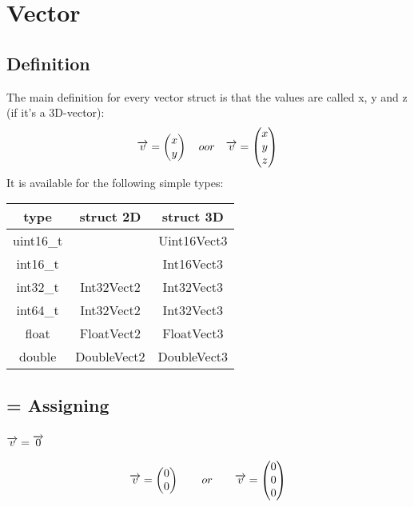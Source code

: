 \section{Vector}
\subsection{Definition}
The main definition for every vector struct is that the values are called x, y and z (if it's a 3D-vector):
\begin{equation}
\overrightarrow{v} = \begin{pmatrix}x\\y\end{pmatrix} \quad oor \quad \overrightarrow{v} = \begin{pmatrix}x\\y\\z\end{pmatrix}
\end{equation}
It is available for the following simple types:\\
\begin{tabular}{c|c|c}
type		& struct 2D		& struct 3D\\ \hline
uint16\_t	& 				& Uint16Vect3	\\
int16\_t 	& 				& Int16Vect3	\\
int32\_t	& Int32Vect2	& Int32Vect3	\\
int64\_t	& Int32Vect2	& Int32Vect3	\\
float		& FloatVect2	& FloatVect3	\\
double		& DoubleVect2	& DoubleVect3	
\end{tabular}


\subsection{= Assigning}
\subsubsection*{$\overrightarrow{v} = \overrightarrow{0}$}
\begin{equation}
 \overrightarrow{v} = \begin{pmatrix} 0 \\ 0 \end{pmatrix} \qquad or \qquad  \overrightarrow{v} = \begin{pmatrix} 0 \\ 0 \\ 0 \end{pmatrix}
\end{equation}

